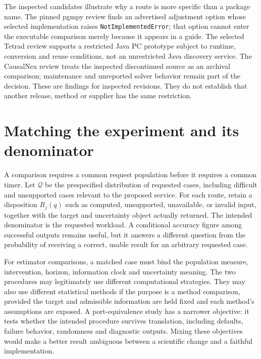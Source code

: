 The inspected candidates illustrate why a route is more specific than a
package name. The pinned pgmpy review finds an advertised adjustment option
whose selected implementation raises \texttt{NotImplementedError}; that option
cannot enter the executable comparison merely because it appears in a guide.
The selected Tetrad review supports a restricted Java PC prototype subject to
runtime, conversion and reuse conditions, not an unrestricted Java discovery
service. The CausalNex review treats the inspected discontinued source as an
archival comparison; maintenance and unreported solver behavior remain part
of the decision. These are findings for inspected revisions. They do not
establish that another release, method or supplier has the same restriction.
\citep{exec13_pgmpy_reuse_primary,exec13_tetrad_reuse_decision,exec14_causalnex_primary}

\section{Matching the experiment and its denominator}

A comparison requires a common request population before it requires a common
timer. Let \(\mathcal Q\) be the prespecified distribution of requested cases,
including difficult and unsupported cases relevant to the proposed service.
For each route, retain a disposition \(R_j(q)\) such as computed, unsupported,
unavailable, or invalid input, together with the target and uncertainty object
actually returned. The intended denominator is the requested workload. A
conditional accuracy figure among successful outputs remains useful, but it
answers a different question from the probability of receiving a correct,
usable result for an arbitrary requested case.

For estimator comparisons, a matched case must bind the population measure,
intervention, horizon, information clock and uncertainty meaning. The two
procedures may legitimately use different computational strategies. They may
also use different statistical methods if the purpose is a method comparison,
provided the target and admissible information are held fixed and each method's
assumptions are exposed. A port-equivalence study has a narrower objective: it
tests whether the intended procedure survives translation, including defaults,
failure behavior, randomness and diagnostic outputs. Mixing these objectives
would make a better result ambiguous between a scientific change and a faithful
implementation.

